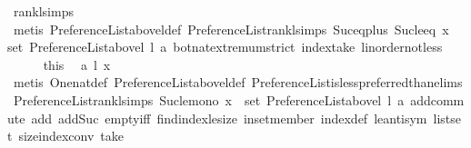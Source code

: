 \begin{isabellebody}
\ rank{\isacharunderscore}{\kern0pt}l{\isachardot}{\kern0pt}simps\isanewline
\ \ \ \ \ \ \isamarkupfalse%
\ {\isacharparenleft}{\kern0pt}metis\ Preference{\isacharunderscore}{\kern0pt}List{\isachardot}{\kern0pt}above{\isacharunderscore}{\kern0pt}l{\isacharunderscore}{\kern0pt}def\ Preference{\isacharunderscore}{\kern0pt}List{\isachardot}{\kern0pt}rank{\isacharunderscore}{\kern0pt}l{\isachardot}{\kern0pt}simps\ Suc{\isacharunderscore}{\kern0pt}eq{\isacharunderscore}{\kern0pt}plus{}\ Suc{\isacharunderscore}{\kern0pt}le{\isacharunderscore}{\kern0pt}eq\ {\isacartoucheopen}x\ {\isasymin}\ set\ {\isacharparenleft}{\kern0pt}Preference{\isacharunderscore}{\kern0pt}List{\isachardot}{\kern0pt}above{\isacharunderscore}{\kern0pt}l\ l\ a{\isacharparenright}{\kern0pt}{\isacartoucheclose}\ bot{\isacharunderscore}{\kern0pt}nat{\isacharunderscore}{\kern0pt}{}{\isachardot}{\kern0pt}extremum{\isacharunderscore}{\kern0pt}strict\ index{\isacharunderscore}{\kern0pt}take\ linorder{\isacharunderscore}{\kern0pt}not{\isacharunderscore}{\kern0pt}less{\isacharparenright}{\kern0pt}\isanewline
\ \ \ \ \isamarkupfalse%
\ this\ \isamarkupfalse%
\ {\isachardoublequoteopen}a\ {\isasymlesssim}\isactrlsub l\ x{\isachardoublequoteclose}\isanewline
\ \ \ \ \ \ \isamarkupfalse%
\ {\isacharparenleft}{\kern0pt}metis\ One{\isacharunderscore}{\kern0pt}nat{\isacharunderscore}{\kern0pt}def\ Preference{\isacharunderscore}{\kern0pt}List{\isachardot}{\kern0pt}above{\isacharunderscore}{\kern0pt}l{\isacharunderscore}{\kern0pt}def\ Preference{\isacharunderscore}{\kern0pt}List{\isachardot}{\kern0pt}is{\isacharunderscore}{\kern0pt}less{\isacharunderscore}{\kern0pt}preferred{\isacharunderscore}{\kern0pt}than{\isachardot}{\kern0pt}elims{\isacharparenleft}{\kern0pt}{}{\isacharparenright}{\kern0pt}\ Preference{\isacharunderscore}{\kern0pt}List{\isachardot}{\kern0pt}rank{\isacharunderscore}{\kern0pt}l{\isachardot}{\kern0pt}simps\ Suc{\isacharunderscore}{\kern0pt}le{\isacharunderscore}{\kern0pt}mono\ {\isacartoucheopen}x\ {\isasymin}\ set\ {\isacharparenleft}{\kern0pt}Preference{\isacharunderscore}{\kern0pt}List{\isachardot}{\kern0pt}above{\isacharunderscore}{\kern0pt}l\ l\ a{\isacharparenright}{\kern0pt}{\isacartoucheclose}\ add{\isachardot}{\kern0pt}commute\ add{\isacharunderscore}{\kern0pt}{}\ add{\isacharunderscore}{\kern0pt}Suc\ empty{\isacharunderscore}{\kern0pt}iff\ find{\isacharunderscore}{\kern0pt}index{\isacharunderscore}{\kern0pt}le{\isacharunderscore}{\kern0pt}size\ in{\isacharunderscore}{\kern0pt}set{\isacharunderscore}{\kern0pt}member\ index{\isacharunderscore}{\kern0pt}def\ le{\isacharunderscore}{\kern0pt}antisym\ list{\isachardot}{\kern0pt}set{\isacharparenleft}{\kern0pt}{}{\isacharparenright}{\kern0pt}\ size{\isacharunderscore}{\kern0pt}index{\isacharunderscore}{\kern0pt}conv\ take{\isacharunderscore}{\kern0pt}{}{\isacharparenright}{\kern0pt}\isanewline

\end{isabellebody}

